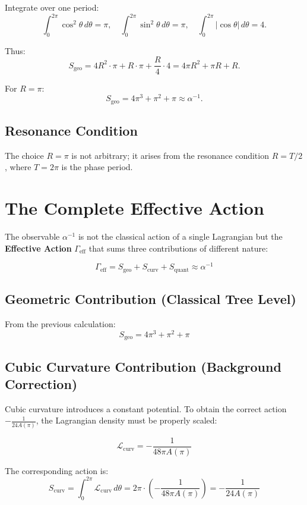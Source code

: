 \documentclass[12pt]{article}
\begin{document}
Integrate over one period:
\[
\int_0^{2\pi} \cos^2\theta\,d\theta = \pi, \quad
\int_0^{2\pi} \sin^2\theta\,d\theta = \pi, \quad
\int_0^{2\pi} |\cos\theta|\,d\theta = 4.
\]

Thus:
\[
S_{\text{geo}} = 4R^2 \cdot \pi + R \cdot \pi + \frac{R}{4} \cdot 4 = 4\pi R^2 + \pi R + R.
\]

For $R = \pi$:
\[
S_{\text{geo}} = 4\pi^3 + \pi^2 + \pi \approx \alpha^{-1}.
\]

\subsection{Resonance Condition}

The choice $R = \pi$ is not arbitrary; it arises from the resonance condition $R = T/2$, where $T = 2\pi$ is the phase period.

\section{The Complete Effective Action}

The observable $\alpha^{-1}$ is not the classical action of a single Lagrangian but the \textbf{Effective Action} $\Gamma_{\text{eff}}$ that sums three contributions of different nature:

\[
\boxed{\Gamma_{\text{eff}} = S_{\text{geo}} + S_{\text{curv}} + S_{\text{quant}} \approx \alpha^{-1}}
\]

\subsection{Geometric Contribution (Classical Tree Level)}

From the previous calculation:
\[
S_{\text{geo}} = 4\pi^3 + \pi^2 + \pi
\]

\subsection{Cubic Curvature Contribution (Background Correction)}

Cubic curvature introduces a constant potential. To obtain the correct action $-\frac{1}{24A(\pi)}$, the Lagrangian density must be properly scaled:

\[
\mathcal{L}_{\text{curv}} = -\frac{1}{48\pi A(\pi)}
\]

The corresponding action is:
\[
S_{\text{curv}} = \int_0^{2\pi} \mathcal{L}_{\text{curv}} \, d\theta = 2\pi \cdot \left(-\frac{1}{48\pi A(\pi)}\right) = -\frac{1}{24A(\pi)}
\]
\end{document}
